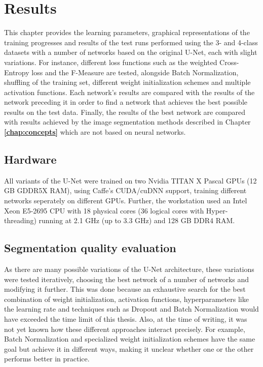 \chapter {Results}
\label{chap:results}

This chapter provides the learning parameters, graphical representations of the training progresses and results of the test runs performed using the 3- and 4-class datasets with a number of networks based on the original U-Net, each with slight variations. For instance, different loss functions such as the weighted Cross-Entropy loss and the F-Measure are tested, alongside Batch Normalization, shuffling of the training set, different weight initialization schemes and multiple activation functions. Each network's results are compared with the results of the network preceding it in order to find a network that achieves the best possible results on the test data. Finally, the results of the best network are compared with results achieved by the image segmentation methods described in Chapter \textbf{\ref{chap:concepts}} which are not based on neural networks.

	\section{Hardware}
All variants of the U-Net were trained on two Nvidia TITAN X Pascal GPUs (12 GB GDDR5X RAM), using Caffe's CUDA/cuDNN support, training different networks seperately on different GPUs. Further, the workstation used an Intel Xeon E5-2695 CPU with 18 physical cores (36 logical cores with Hyper-threading) running at 2.1 GHz (up to 3.3 GHz) and 128 GB DDR4 RAM.

	\section {Segmentation quality evaluation}

\noindent As there are many possible variations of the U-Net architecture, these variations were tested iteratively, choosing the best network of a number of networks and modifying it further. This was done because an exhaustive search for the best combination of weight initialization, activation functions, hyperparameters like the learning rate and techniques such as Dropout and Batch Normalization would have exceeded the time limit of this thesis. Also, at the time of writing, it was not yet known how these different approaches interact precisely. For example, Batch Normalization and specialized weight initialization schemes have the same goal but achieve it in different ways, making it unclear whether one or the other performs better in practice.\\

